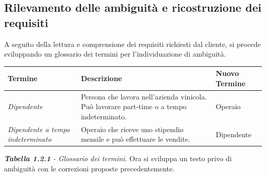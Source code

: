 \documentclass{article}
\begin{document}
\newpage
\subsection{Rilevamento delle ambiguità e ricostruzione dei requisiti}

A seguito della lettura e comprensione dei requisiti richiesti dal cliente, si procede sviluppando un glossario dei termini per l'individuazione di ambiguità.\\
\newline
\newline
\begin{tabular}{p{}p{}p{}}\hline
    \textbf{Termine} & \textbf{Descrizione} & \textbf{Nuovo Termine} \\\hline
     \textit{Dipendente } & Persona che lavora nell'azienda vinicola. Può lavorare part-time o a tempo indeterminato. &   Operaio \\ \hline
     \textit{Dipendente a tempo indeterminato} & Operaio che riceve uno stipendio mensile e può effettuare le vendite. & Dipendente\\ \hline
\end{tabular}
\newline
\textit{\textbf{Tabella 1.2.1}  - Glossario dei termini.}
\newline
\newline
Ora si sviluppa un testo privo di ambiguità con le correzioni proposte precedentemente.\\
\newline
\end{document}
